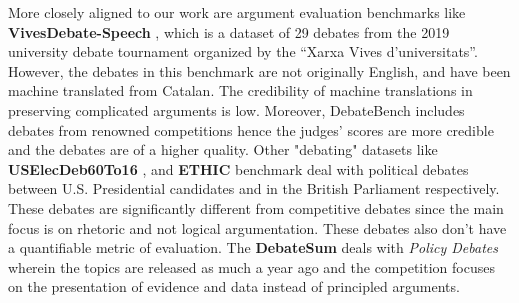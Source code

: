More closely aligned to our work are argument evaluation benchmarks like \textbf{VivesDebate-Speech} \citep{ruizdolz2024vivesdebatespeechcorpusspokenargumentation}, which is a dataset of 29 debates from the 2019 university debate tournament organized by the “Xarxa Vives d’universitats”. However, the debates in this benchmark are not originally English, and have been machine translated from Catalan. The credibility of machine translations in preserving complicated arguments is low. Moreover, DebateBench includes debates from renowned competitions hence the judges' scores are more credible and the debates are of a higher quality. Other "debating" datasets like \textbf{USElecDeb60To16} \citep{haddadan-etal-2019-yes}, and \textbf{ETHIC} \citep{lee2024ethicevaluatinglargelanguage} benchmark deal with political debates between U.S. Presidential candidates and in the British Parliament respectively. These debates are significantly different from competitive debates since the main focus is on rhetoric and not logical argumentation. These debates also don't have a quantifiable metric of evaluation. The \textbf{DebateSum} \citep{roush-balaji-2020-debatesum} deals with \textit{Policy Debates} wherein the topics are released as much a year ago and the competition focuses on the presentation of evidence and data instead of principled arguments. 





